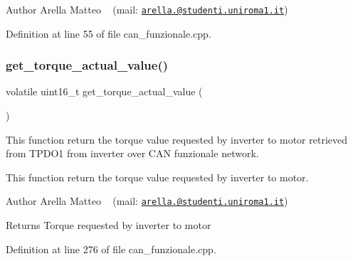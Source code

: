 \begin{DoxyAuthor}{Author}
Arella Matteo ~\newline
 (mail\+: \href{mailto:arella.1646983@studenti.uniroma1.it}{\tt arella.@studenti.\+uniroma1.\+it}) 
\end{DoxyAuthor}


Definition at line 55 of file can\+\_\+funzionale.\+cpp.

\mbox{\label{group___c_a_n__funzionale__group_ga3c4828f57a818b8e1b2f277c2174b5da}} 
\subsubsection{\texorpdfstring{get\+\_\+torque\+\_\+actual\+\_\+value()}{get\_torque\_actual\_value()}}
{\footnotesize\ttfamily volatile uint16\+\_\+t get\+\_\+torque\+\_\+actual\+\_\+value (\begin{DoxyParamCaption}{ }\end{DoxyParamCaption})}



This function return the torque value requested by inverter to motor retrieved from T\+P\+D\+O1 from inverter over C\+AN funzionale network. 

This function return the torque value requested by inverter to motor.

\begin{DoxyAuthor}{Author}
Arella Matteo ~\newline
 (mail\+: \href{mailto:arella.1646983@studenti.uniroma1.it}{\tt arella.@studenti.\+uniroma1.\+it})
\end{DoxyAuthor}
\begin{DoxyReturn}{Returns}
Torque requested by inverter to motor 
\end{DoxyReturn}


Definition at line 276 of file can\+\_\+funzionale.\+cpp.

\mbox{\label{group___c_a_n__funzionale__group_ga75820e0d72b7f264a70d99f414745518}} 

